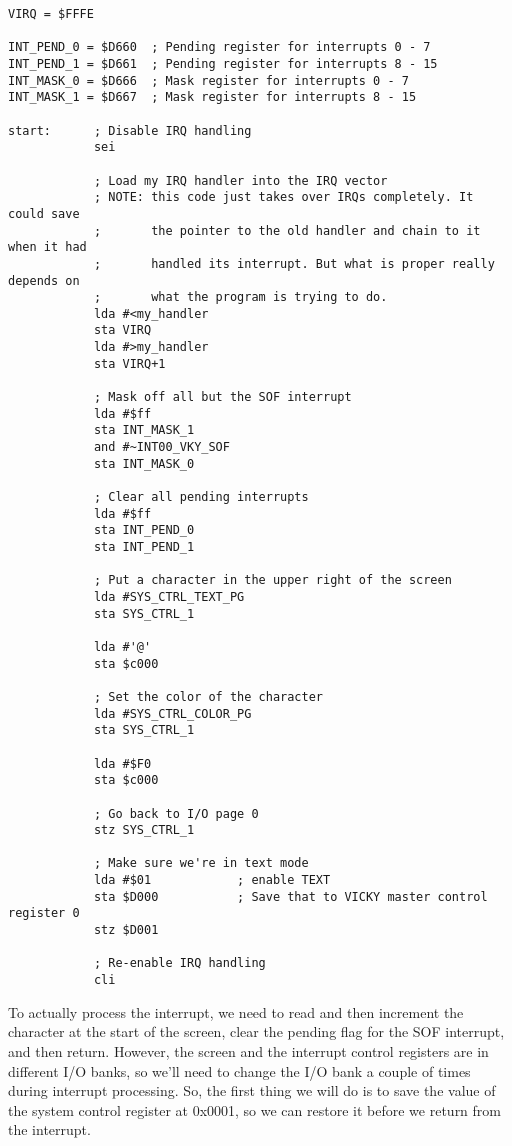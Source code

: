 \begin{verbatim}
VIRQ = $FFFE

INT_PEND_0 = $D660  ; Pending register for interrupts 0 - 7
INT_PEND_1 = $D661  ; Pending register for interrupts 8 - 15
INT_MASK_0 = $D666  ; Mask register for interrupts 0 - 7
INT_MASK_1 = $D667  ; Mask register for interrupts 8 - 15

start:      ; Disable IRQ handling
            sei

            ; Load my IRQ handler into the IRQ vector
            ; NOTE: this code just takes over IRQs completely. It could save
            ;       the pointer to the old handler and chain to it when it had
            ;       handled its interrupt. But what is proper really depends on
            ;       what the program is trying to do.
            lda #<my_handler
            sta VIRQ
            lda #>my_handler
            sta VIRQ+1

            ; Mask off all but the SOF interrupt
            lda #$ff
            sta INT_MASK_1
            and #~INT00_VKY_SOF
            sta INT_MASK_0

            ; Clear all pending interrupts
            lda #$ff
            sta INT_PEND_0
            sta INT_PEND_1

            ; Put a character in the upper right of the screen
            lda #SYS_CTRL_TEXT_PG
            sta SYS_CTRL_1

            lda #'@'
            sta $c000

            ; Set the color of the character
            lda #SYS_CTRL_COLOR_PG
            sta SYS_CTRL_1

            lda #$F0
            sta $c000

            ; Go back to I/O page 0
            stz SYS_CTRL_1

            ; Make sure we're in text mode
            lda #$01            ; enable TEXT
            sta $D000           ; Save that to VICKY master control register 0
            stz $D001

            ; Re-enable IRQ handling
            cli
\end{verbatim}

To actually process the interrupt, we need to read and then increment the character at the start of the screen, clear the pending flag for the SOF interrupt, and then return. However, the screen and the interrupt control registers are in different I/O banks, so we’ll need to change the I/O bank a couple of times during interrupt processing. So, the first thing we will do is to save the value of the system control register at 0x0001, so we can restore it before we return from the interrupt.

